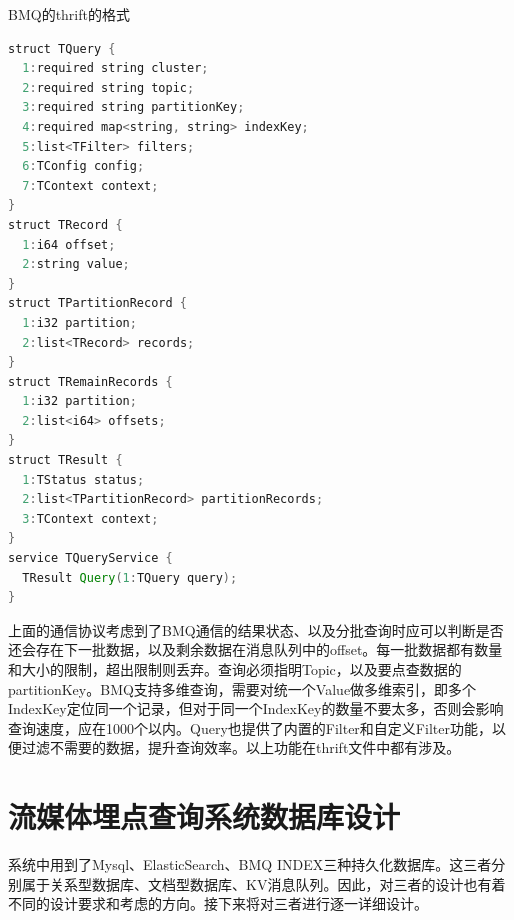 \begin{table}[h]  
\caption{BMQ的thrift的格式}  
\label{tab:mycode}  
\usebox{\mylistingboxOne}  
\end{table}  

\begin{lrbox}{\mylistingboxTwo}  
\begin{lstlisting}[language=Java]  
struct TQuery {
  1:required string cluster;
  2:required string topic;
  3:required string partitionKey;
  4:required map<string, string> indexKey;
  5:list<TFilter> filters;
  6:TConfig config;
  7:TContext context;
}
struct TRecord {
  1:i64 offset;
  2:string value;
}
struct TPartitionRecord {
  1:i32 partition;
  2:list<TRecord> records;
}
struct TRemainRecords {
  1:i32 partition;
  2:list<i64> offsets;
}
struct TResult {
  1:TStatus status;
  2:list<TPartitionRecord> partitionRecords;
  3:TContext context;
}
service TQueryService {
  TResult Query(1:TQuery query);
} 
\end{lstlisting}  
\end{lrbox} 
\begin{table}[h]  
\usebox{\mylistingboxTwo}  
\end{table}  



上面的通信协议考虑到了BMQ通信的结果状态、以及分批查询时应可以判断是否还会存在下一批数据，以及剩余数据在消息队列中的offset。每一批数据都有数量和大小的限制，超出限制则丢弃。查询必须指明Topic，以及要点查数据的partitionKey。BMQ支持多维查询，需要对统一个Value做多维索引，即多个IndexKey定位同一个记录，但对于同一个IndexKey的数量不要太多，否则会影响查询速度，应在1000个以内。Query也提供了内置的Filter和自定义Filter功能，以便过滤不需要的数据，提升查询效率。以上功能在thrift文件中都有涉及。

\section{流媒体埋点查询系统数据库设计}
系统中用到了Mysql、ElasticSearch、BMQ INDEX三种持久化数据库。这三者分别属于关系型数据库、文档型数据库、KV消息队列。因此，对三者的设计也有着不同的设计要求和考虑的方向。接下来将对三者进行逐一详细设计。

